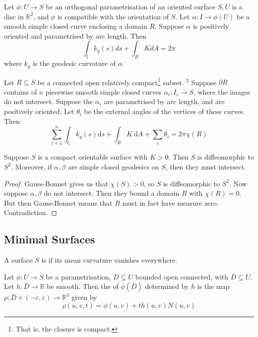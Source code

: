 \documentclass[10pt]{article}
\begin{document}
\begin{theorem}
Let $\phi: U \rightarrow S$ be an orthogonal parametrisation of an oriented surface $S, U$ is a disc in $\mathbb{R}^2$, and $\phi$ is compatible with the orientation of $S$. Let $\alpha: I \rightarrow \phi(U)$ be a smooth simple closed curve enclosing a domain $R$. Suppose $\alpha$ is positively oriented and parametrised by arc length. Then
$$
\int_l k_g(s) d s+\int_R K d A=2 \pi
$$
where $k_g$ is the geodesic curvature of $\alpha$.
\end{theorem}

\begin{theorem}
Let $R \subseteq S$ be a connected open relatively compact\footnote{That is, the closure is compact.} subset. $^2$ Suppose $\partial R$ contains of $n$ piecewise smooth simple closed curves $\alpha_i: I_i \rightarrow S$, where the images do not intersect. Suppose the $\alpha_i$ are parametrised by arc length, and are positively oriented. Let $\theta_i$ be the external angles of the vertices of these curves. Then
    $$
    \sum_{i=1}^n \int_{l_i} k_g(s) \mathrm{d} s+\int_R K \mathrm{~d} A+\sum_i \theta_i=2 \pi \chi(R)
    $$
\end{theorem}

\begin{theorem}
    Suppose $S$ is a compact orientable surface with $K>0$. Then $S$ is diffeomorphic to $S^2$. Moreover, if $\alpha, \beta$ are simple closed geodesics on $S$, then they must intersect.
\end{theorem}
\begin{proof}
    Gauss-Bonnet gives us that $\chi(S)>0$, so $S$ is diffeomorphic to $S^2$. Now suppose $\alpha, \beta$ do not intersect. Then they bound a domain $R$ with $\chi(R)=0$. But then Gauss-Bonnet means that $R$ must in fact have measure zero. Contradiction.
\end{proof}

\subsection{Minimal Surfaces}

\begin{definition}
    A surface $S$ is  if its mean curvature vanishes everywhere.
\end{definition}

\begin{definition}
    Let $\phi: U \rightarrow S$ be a parametrisation, $D \subseteq U$ bounded open connected, with $\bar{D} \subseteq U$. Let $h: \bar{D} \rightarrow \mathbb{R}$ be smooth. Then the  of $\phi(\bar{D})$ determined by $h$ is the map $\rho: \bar{D} \times(-\varepsilon, \varepsilon) \rightarrow \mathbb{R}^3$ given by
$$
\rho(u, v, t)=\phi(u, v)+t h(u, v) N(u, v)
$$
\end{definition}


\end{document}
